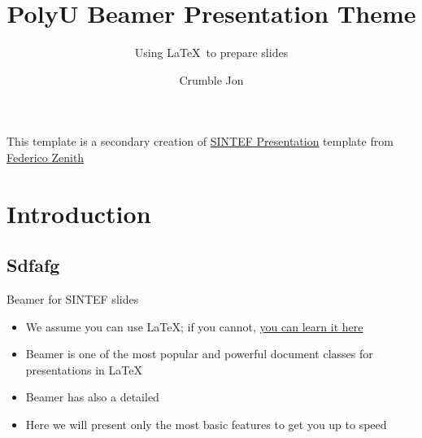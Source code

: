 \documentclass[10pt,aspectratio=169]{beamer}
\title{PolyU Beamer Presentation Theme}
\subtitle{Using \LaTeX\ to prepare slides}
\author{Crumble Jon}
\begin{document}
\maketitle

\begin{frame}
This template is a secondary creation of \href{https://www.overleaf.com/latex/templates/sintef-presentation/jhbhdffczpnx}{SINTEF Presentation} template from \href{mailto:federico.zenith@sintef.no}{Federico Zenith}

%
%
%
%
\end{frame}

\section{Introduction}

\subsection{Sdfafg}

\begin{frame}{Beamer for SINTEF slides}{\thesection \, \secname}
\begin{itemize}
\item We assume you can use \LaTeX; if you cannot,
\href{http://en.wikibooks.org/wiki/LaTeX/}{you can learn it here}
\item Beamer is one of the most popular and powerful document
classes for presentations in \LaTeX
\item Beamer has also a detailed
\item Here we will present only the most basic features to get you up to speed
\end{itemize}
\end{frame}
\end{document}
